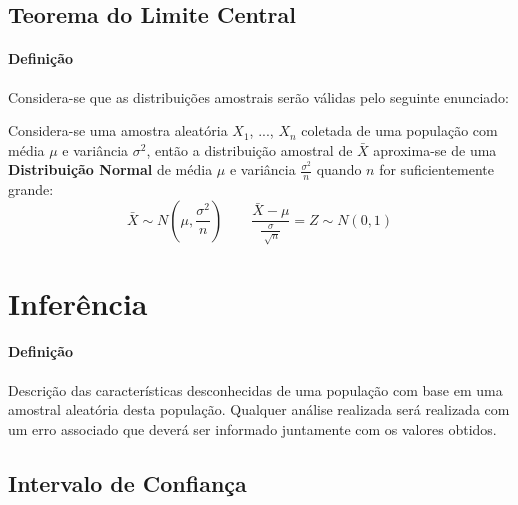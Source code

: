 \documentclass{article}
\begin{document}
        \subsection{Teorema do Limite Central}
            \paragraph{Definição}Considera-se que as distribuições amostrais serão válidas pelo seguinte enunciado:
                \begin{displayquote}[][]
                    Considera-se uma amostra aleatória $X_{1}$, ..., $X_{n}$ coletada de uma população com média $\mu$ e variância $\sigma^{2}$, então a distribuição amostral de $\bar{X}$ aproxima-se de uma \textbf{Distribuição Normal} de média $\mu$ e variância $\frac{\sigma^{2}}{n}$ quando $n$ for suficientemente grande:
                        \begin{equation}
                            \boxed{
                                \bar{X} \sim N \left(\mu, \frac{\sigma^{2}}{n}\right)
                            }
                            \qquad
                            \boxed{
                                \frac{\bar{X} - \mu}{\frac{\sigma}{\sqrt[]{n}}} =
                                Z \sim
                                N(0,1)
                            }
                        \end{equation}
                \end{displayquote}
\newpage

    \section{Inferência}
        \paragraph{Definição}Descrição das características desconhecidas de uma população com base em uma amostral aleatória desta população. Qualquer análise realizada será realizada com um erro associado que deverá ser informado juntamente com os valores obtidos.

        \subsection{Intervalo de Confiança}
\end{document}
